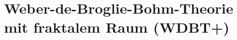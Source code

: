 \documentclass[11pt,a4paper]{book}
\begin{document}
\part{Weber-de-Broglie-Bohm-Theorie mit fraktalem Raum (WDBT+)}
\label{part:wdbt}











\appendix
\label{app:start}
















\end{document}
